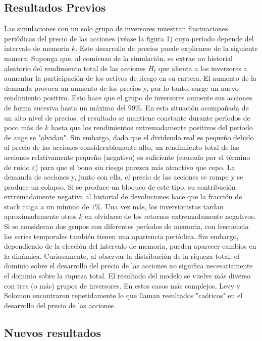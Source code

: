\documentclass[12pt,a4paper]{article}
\begin{document}
\subsection*{Resultados Previos}
Las simulaciones con un solo grupo de inversores muestran fluctuaciones periódicas del precio de las acciones (véase la figura 1) cuyo período depende del intervalo de memoria $k$. Este desarrollo de precios puede explicarse de la siguiente manera: Suponga que, al comienzo de la simulación, se extrae un historial aleatorio del rendimiento total de las acciones $ H_t $ que alienta a los inversores a aumentar la participación de los activos de riesgo en su cartera. El aumento de la demanda provoca un aumento de los precios y, por lo tanto, surge un nuevo rendimiento positivo. Esto hace que el grupo de inversores aumente sus acciones de forma sucesiva hasta un máximo del 99$\%$. En esta situación acompañada de un alto nivel de precios, el resultado se mantiene constante durante períodos de poco más de $ k $ hasta que los rendimientos extremadamente positivos del período de auge se "olvidan". Sin embargo, dado que el dividendo real es pequeño debido al precio de las acciones considerablemente alto, un rendimiento total de las acciones relativamente pequeño (negativo) es suficiente (causado por el término de ruido $ \varepsilon$) para que el bono sin riesgo parezca más atractivo que cepo. La demanda de acciones y, junto con ella, el precio de las acciones se rompe y se produce un colapso. Si se produce un bloqueo de este tipo, su contribución extremadamente negativa al historial de devoluciones hace que la fracción de stock caiga a un mínimo de $ 1\% $. Una vez más, los inversionistas tardan aproximadamente otros $ k $ en olvidarse de los retornos extremadamente negativos.\\
\quad Si se consideran dos grupos con diferentes períodos de memoria, con frecuencia las series temporales también tienen una apariencia periódica. Sin embargo, dependiendo de la elección del intervalo de memoria, pueden aparecer cambios en la dinámica. Curiosamente, al observar la distribución de la riqueza total, el dominio sobre el desarrollo del precio de las acciones no significa necesariamente el dominio sobre la riqueza total. El resultado del modelo se vuelve más diverso con tres (o más) grupos de inversores. En estos casos más complejos, Levy y Solomon encontraron repetidamente lo que llaman resultados "caóticos" en el desarrollo del precio de las acciones.
\subsection*{Nuevos resultados}
\end{document}
